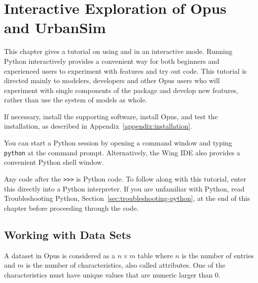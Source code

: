 
\chapter{Interactive Exploration of Opus and UrbanSim}
\label{urbansim-tutorial}

This chapter gives a tutorial on using  and  in an interactive mode.
Running Python \pythonindex interactively provides a convenient way for both beginners
and experienced users to experiment with features and try out code.  This
tutorial is directed mainly to modelers, developers and other Opus users
who will experiment with single components of the package and develop new
features, rather than use the system of models as whole.

If necessary, install the supporting software, install Opus, and test
the installation, as described in Appendix~\ref{appendix:installation}.

You can start a Python session by opening a command window and
typing \verb|python| at the command prompt. Alternatively, the
Wing IDE \wingindex also provides a convenient Python shell window.

Any code after the \verb|>>>| is Python code.  To follow along with this
tutorial, enter this directly into a Python interpreter.  If you are unfamiliar
with Python, read Troubleshooting Python,
Section~\ref{sec:troubleshooting-python}, at the end of this chapter before
proceeding through the code.

\section{Working with Data Sets}
\label{sec:datasets}

A dataset \datasetindex in Opus is considered as a $n \times m$ table where $n$ is the
number of entries and $m$ is the number of characteristics, \characteristicsindex also called
attributes. \attributesindex One of the characteristics \characteristicsindex must have unique values
that are numeric larger than 0.

